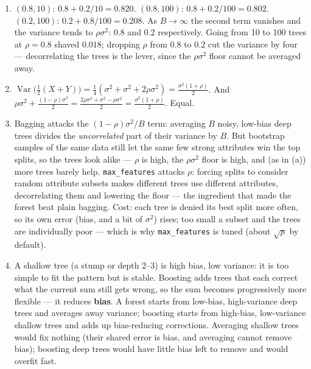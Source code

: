 \documentclass[
  11pt,
]{article}
\begin{document}
\begin{solutionbox}
\begin{enumerate}
\def\labelenumi{(\alph{enumi})}
\item
  \((0.8, 10)\): \(0.8 + 0.2/10 = 0.820\). \((0.8, 100)\):
  \(0.8 + 0.2/100 = 0.802\). \((0.2, 100)\): \(0.2 + 0.8/100 = 0.208\).
  As \(B \to \infty\) the second term vanishes and the variance tends to
  \(\rho\sigma^2\): \(0.8\) and \(0.2\) respectively. Going from 10 to
  100 trees at \(\rho = 0.8\) shaved \(0.018\); dropping \(\rho\) from
  \(0.8\) to \(0.2\) cut the variance by four --- decorrelating the
  trees is the lever, since the \(\rho\sigma^2\) floor cannot be
  averaged away.
\item
  \(\operatorname{Var}\big(\tfrac12(X+Y)\big) = \tfrac14(\sigma^2 + \sigma^2 + 2\rho\sigma^2)
  = \tfrac{\sigma^2(1+\rho)}{2}\). And
  \(\rho\sigma^2 + \tfrac{(1-\rho)\sigma^2}{2} = \tfrac{2\rho\sigma^2 + \sigma^2 - \rho\sigma^2}{2}
  = \tfrac{\sigma^2(1+\rho)}{2}\). Equal.
\item
  Bagging attacks the \((1-\rho)\sigma^2/B\) term: averaging \(B\)
  noisy, low-bias deep trees divides the \emph{uncorrelated} part of
  their variance by \(B\). But bootstrap samples of the same data still
  let the same few strong attributes win the top splits, so the trees
  look alike --- \(\rho\) is high, the \(\rho\sigma^2\) floor is high,
  and (as in (a)) more trees barely help. \texttt{max\_features} attacks
  \(\rho\): forcing splits to consider random attribute subsets makes
  different trees use different attributes, decorrelating them and
  lowering the floor --- the ingredient that made the forest beat plain
  bagging. Cost: each tree is denied its best split more often, so its
  own error (bias, and a bit of \(\sigma^2\)) rises; too small a subset
  and the trees are individually poor --- which is why
  \texttt{max\_features} is tuned (about \(\sqrt{p}\) by default).
\item
  A shallow tree (a stump or depth 2--3) is high bias, low variance: it
  is too simple to fit the pattern but is stable. Boosting adds trees
  that each correct what the current sum still gets wrong, so the sum
  becomes progressively more flexible --- it reduces \textbf{bias}. A
  forest starts from low-bias, high-variance deep trees and averages
  away variance; boosting starts from high-bias, low-variance shallow
  trees and adds up bias-reducing corrections. Averaging shallow trees
  would fix nothing (their shared error is bias, and averaging cannot
  remove bias); boosting deep trees would have little bias left to
  remove and would overfit fast.
\end{enumerate}

\end{solutionbox}
\end{document}
